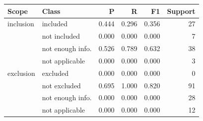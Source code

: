 \begin{tabular}{llrrrr}\toprule
Scope & Class & P & R & F1 & Support \\\midrule
inclusion & included & 0.444 & 0.296 & 0.356 & 27 \\
 & not included & 0.000 & 0.000 & 0.000 & 7 \\
 & not enough info. & 0.526 & 0.789 & 0.632 & 38 \\
 & not applicable & 0.000 & 0.000 & 0.000 & 3 \\
\midrule
exclusion & excluded & 0.000 & 0.000 & 0.000 & 0 \\
 & not excluded & 0.695 & 1.000 & 0.820 & 91 \\
 & not enough info. & 0.000 & 0.000 & 0.000 & 28 \\
 & not applicable & 0.000 & 0.000 & 0.000 & 12 \\
\bottomrule\end{tabular}
